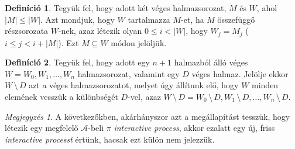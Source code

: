 \documentclass[12pt]{article}
\theoremstyle{definition}
\newtheorem{definition}{Definíció}
\theoremstyle{remark}
\newtheorem*{remark*}{Megjegyzés}
\theoremstyle{plain}
\theoremstyle{remark}
\theoremstyle{plain}
\begin{document}
    \begin{definition}
        Tegyük fel, hogy adott két véges halmazsorozat, $M$ és $W$, ahol $|M| \leq |W|$. Azt mondjuk, hogy $W$ tartalmazza $M$-et, ha $M$ összefüggő részsorozata $W$-nek, azaz létezik olyan $0 \leq i < |W|$, hogy $W_{j} = M_{j}$ ($i \leq j < i + |M|$). Ezt $M \subseteq W$ módon jelöljük.
    \end{definition}

    \begin{definition}
        Tegyük fel, hogy adott egy $n + 1$ halmazból álló véges $W=W_{0}, W_{1}, \ldots, W_{n}$ halmazsorozat, valamint egy $D$ véges halmaz. Jelölje ekkor $W \,\setminus\, D$ azt a véges halmazsorozatot, melyet úgy állítunk elő, hogy $W$ minden elemének vesszük a különbségét $D$-vel, azaz $W \,\setminus\, D = W_{0} \,\setminus\, D, W_{1} \,\setminus\, D, \ldots, W_{n} \,\setminus\, D$.
    \end{definition}

    \begin{remark*}
        A következőkben, akárhányszor azt a megállapítást tesszük, hogy létezik egy megfelelő $\mathscr{A}$-beli $\pi$ \textit{interactive process}, akkor ezalatt egy új, friss \textit{interactive processt} értünk, hacsak ezt külön nem jelezzük.
    \end{remark*}
\end{document}
